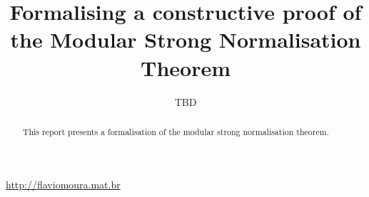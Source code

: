 \documentclass[12pt]{llncs}
\title{Formalising a constructive proof of the Modular Strong Normalisation Theorem}
\author{TBD}
\begin{document}
\maketitle

\begin{abstract}
This report presents a formalisation of the modular strong normalisation theorem.
\end{abstract}

\begin{center} \url{http://flaviomoura.mat.br} \end{center}

\thispagestyle{empty}
\mbox{}\vfill







\clearpage

%

\end{document}

